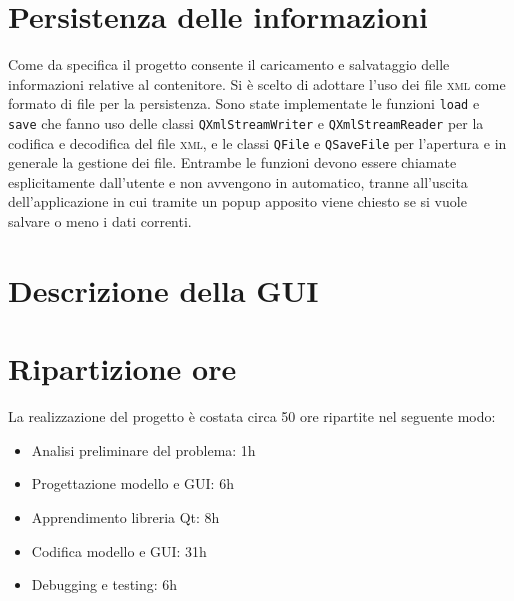     \section*{Persistenza delle informazioni}
        Come da specifica il progetto consente il caricamento e salvataggio delle informazioni relative al contenitore. Si è scelto di adottare l'uso dei file \textsc{xml} come formato di file per la persistenza. \newline
        Sono state implementate le funzioni \texttt{load} e \texttt{save} che fanno uso delle classi \texttt{QXmlStreamWriter} e \texttt{QXmlStreamReader} per la codifica e decodifica del file \textsc{xml}, e le classi \texttt{QFile} e \texttt{QSaveFile} per l'apertura e in generale la gestione dei file. \newline
        Entrambe le funzioni devono essere chiamate esplicitamente dall'utente e non avvengono in automatico, tranne all'uscita dell'applicazione in cui tramite un popup apposito viene chiesto se si vuole salvare o meno i dati correnti.

    \section*{Descrizione della GUI}
        

    \section*{Ripartizione ore}
        La realizzazione del progetto è costata circa 50 ore ripartite nel seguente modo:
        \begin{itemize}
            \item Analisi preliminare del problema: 1h
            \item Progettazione modello e GUI: 6h
            \item Apprendimento libreria Qt: 8h
            \item Codifica modello e GUI: 31h
            \item Debugging e testing: 6h
        \end{itemize}

